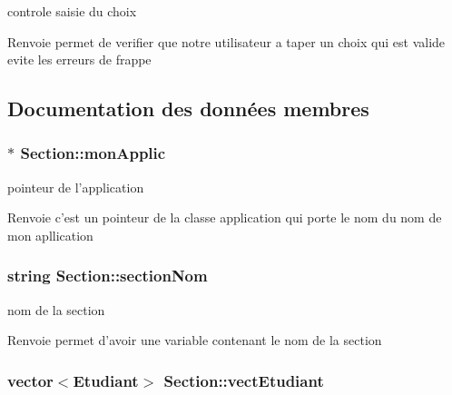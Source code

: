 controle saisie du choix 

\begin{DoxyReturn}{Renvoie}
permet de verifier que notre utilisateur a taper un choix qui est valide evite les erreurs de frappe 
\end{DoxyReturn}


\subsection{Documentation des données membres}
\hypertarget{class_section_a387b69bedffb009e38d88cb272030bd4}{
\subsubsection[{mon\+Applic}]{$\ast$ Section\+::mon\+Applic\hspace{0.3cm}{\ttfamily [private]}}}\label{class_section_a387b69bedffb009e38d88cb272030bd4}


pointeur de l'application 

\begin{DoxyReturn}{Renvoie}
c'est un pointeur de la classe application qui porte le nom du nom de mon apllication 
\end{DoxyReturn}
\hypertarget{class_section_a4bb51bd5ac41f66e9935f8e1e46e1c45}{
\subsubsection[{section\+Nom}]{\setlength{\rightskip}{0pt plus 5cm}string Section\+::section\+Nom\hspace{0.3cm}{\ttfamily [private]}}}\label{class_section_a4bb51bd5ac41f66e9935f8e1e46e1c45}


nom de la section 

\begin{DoxyReturn}{Renvoie}
permet d'avoir une variable contenant le nom de la section 
\end{DoxyReturn}
\hypertarget{class_section_a878e894d29cdbecf573949260a3be53e}{
\subsubsection[{vect\+Etudiant}]{\setlength{\rightskip}{0pt plus 5cm}vector$<${\bf Etudiant}$>$ Section\+::vect\+Etudiant\hspace{0.3cm}{\ttfamily [private]}}}\label{class_section_a878e894d29cdbecf573949260a3be53e}


